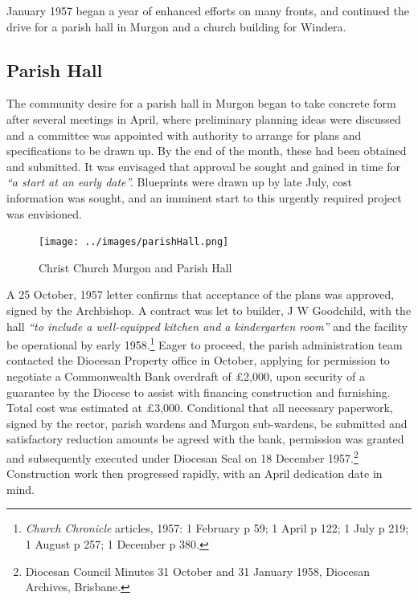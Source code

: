 January 1957 began a year of enhanced efforts on many fronts, and continued the drive for a parish hall in Murgon and a church building for Windera.



\subsection{Parish Hall}



The community desire for a parish hall in Murgon began to take concrete form after several meetings in April, where preliminary planning ideas were discussed and a committee was appointed with authority to arrange for plans and specifications to be drawn up. By the end of the month, these had been obtained and submitted. It was envisaged that approval be sought and gained in time for \emph{``a start at an early date''.} Blueprints were drawn up by late July, cost information was sought, and an imminent start to this urgently required project was envisioned.









\begin{figure}[!htb]
\begin{center}
\texttt{[image: ../images/parishHall.png]}
\caption{Christ Church Murgon and Parish Hall}
\end{center}
\end{figure}




A 25 October, 1957 letter confirms that acceptance of the plans was approved, signed by the Archbishop. A contract was let to builder, J W Goodchild, with the hall \emph{``to include a well-equipped kitchen and a kindergarten room''} and the facility be operational by early 1958.\footnote{\emph{Church Chronicle} articles, 1957: 1 February p 59; 1 April p 122; 1 July p 219; 1 August p 257; 1 December p 380.} Eager to proceed, the parish administration team contacted the Diocesan Property office in October, applying for permission to negotiate a Commonwealth Bank overdraft of \pounds2,000, upon security of a guarantee by the Diocese to assist with financing construction and furnishing. Total cost was estimated at \pounds3,000. Conditional that all necessary paperwork, signed by the rector, parish wardens and Murgon sub-wardens, be submitted and satisfactory reduction amounts be agreed with the bank, permission was granted and subsequently executed under Diocesan Seal on 18 December 1957.\footnote{Diocesan Council Minutes 31 October and 31 January 1958, Diocesan Archives, Brisbane.} Construction work then progressed rapidly, with an April dedication date in mind.



